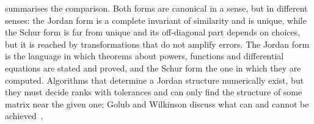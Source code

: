\begin{table}
\end{table}

 summarises the comparison. Both forms are canonical in a sense, but in different senses: the Jordan form is a complete invariant of similarity and is unique, while the Schur form is far from unique and its off-diagonal part depends on choices, but it is reached by transformations that do not amplify errors. The Jordan form is the language in which theorems about powers, functions and differential equations are stated and proved, and the Schur form the one in which they are computed. Algorithms that determine a Jordan structure numerically exist, but they must decide ranks with tolerances and can only find the structure of some matrix near the given one; Golub and Wilkinson discuss what can and cannot be achieved~\cite{golubwilkinson1976}.

